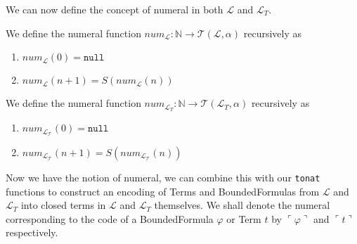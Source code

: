 We can now define the concept of numeral in both $\mathcal{L}$ and $\mathcal{L}_T$.
\begin{definition}\label{def:L-Numeral}
  \leanok
  We define the numeral function $num_{\mathcal{L}} : \mathbb{N} \to \mathcal{T}(\mathcal{L},\alpha)$ recursively as
  \begin{enumerate}
  \item $num_{\mathcal{L}}(0) = \texttt{null}$
  \item $num_{\mathcal{L}}(n + 1) = S(num_{\mathcal{L}}(n))$
  \end{enumerate}
\end{definition}

\begin{definition}\label{def:L_T-Numeral}
  \leanok
  We define the numeral function $num_{\mathcal{L}_T} : \mathbb{N} \to \mathcal{T}(\mathcal{L}_T,\alpha)$ recursively as
  \begin{enumerate}
  \item $num_{\mathcal{L_T}}(0) = \texttt{null}$
  \item $num_{\mathcal{L_T}}(n + 1) = S(num_{\mathcal{L_T}}(n))$
  \end{enumerate}
\end{definition}

Now we have the notion of numeral, we can combine this with our \texttt{tonat} functions to construct an encoding of Terms and BoundedFormulas from $\mathcal{L}$ and $\mathcal{L}_T$ into closed terms in $\mathcal{L}$ and $\mathcal{L}_T$ themselves. We shall denote the numeral corresponding to the code of a BoundedFormula $\varphi$ or Term $t$ by $\ulcorner \varphi \urcorner$ and $\ulcorner t \urcorner$ respectively.


